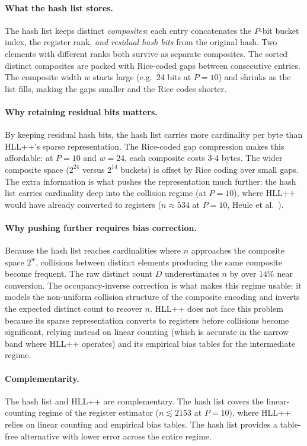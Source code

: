\documentclass[11pt,letterpaper]{article}
\begin{document}
\paragraph{What the hash list stores.}
The hash list keeps distinct \emph{composites}: each
entry concatenates the $P$-bit bucket index, the register rank,
\emph{and residual hash bits} from the original hash. Two elements
with different ranks both survive as separate composites. The sorted
distinct composites are packed with Rice-coded gaps between
consecutive entries. The composite width $w$ starts large (e.g.\ 24
bits at $P = 10$) and shrinks as the list fills, making the gaps
smaller and the Rice codes shorter.

\paragraph{Why retaining residual bits matters.}
By keeping residual hash bits, the hash list carries more
cardinality per byte than HLL++'s sparse representation. The Rice-coded gap
compression makes this affordable: at $P = 10$ and $w = 24$, each
composite costs 3-4 bytes. The wider composite space ($2^{24}$ versus
$2^{14}$ buckets) is offset by Rice coding over small gaps. The extra
information is what pushes the representation much further: the hash
list carries cardinality deep into the collision regime
(at $P = 10$), where HLL++ would have already converted to registers
($n \approx 534$ at $P = 10$, Heule et al.~\cite{heule2013hyperloglog}).

\paragraph{Why pushing further requires bias correction.}
Because the hash list reaches cardinalities where $n$
approaches the composite space $2^w$, collisions between distinct elements
producing the same composite become frequent. The raw distinct count
$D$ underestimates $n$ by over $14\%$ near conversion. The
occupancy-inverse correction is what makes this regime usable: it
models the non-uniform collision structure of the composite encoding
and inverts the expected distinct count to recover $n$. HLL++ does not
face this problem because its sparse representation converts to
registers before collisions become significant, relying instead on
linear counting (which is accurate in the narrow band where HLL++
operates) and its empirical bias tables for the intermediate regime.

\paragraph{Complementarity.}
The hash list and HLL++ are complementary. The hash
list covers the linear-counting regime of the register
estimator ($n \lesssim 2153$ at $P = 10$), where HLL++ relies on
linear counting and empirical bias tables. The hash list
provides a table-free alternative with lower error across the entire regime.
\end{document}
